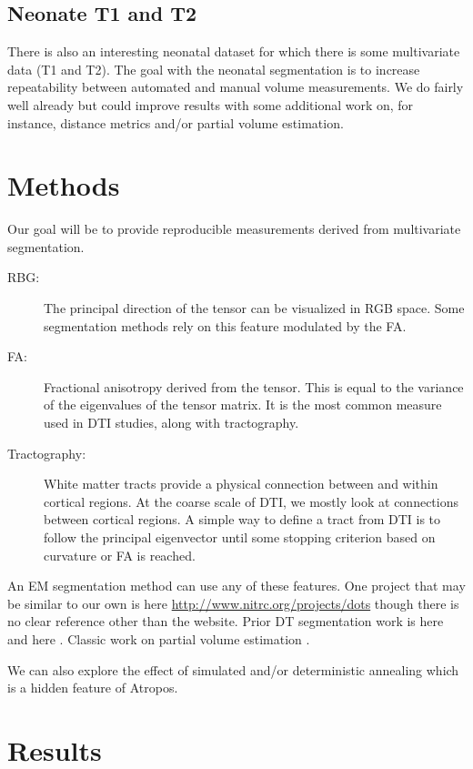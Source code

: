 \documentclass[11pt,english]{article}
\begin{document}
\subsection{Neonate T1 and T2} There is also an interesting neonatal
dataset for which there is some multivariate data (T1 and T2).  The
goal with the neonatal segmentation is to increase repeatability
between automated and manual volume measurements.  We do fairly well
already but could improve results with some additional work on, for
instance, distance metrics and/or partial volume estimation.

\section{Methods} Our goal will be to provide reproducible
measurements derived from multivariate segmentation.
\begin{description}
\item[RBG:] The principal direction of the tensor can be visualized in
  RGB space.  Some segmentation methods rely on this feature 
  modulated by the FA.
\item[FA:] Fractional anisotropy derived from the tensor.  This is
  equal to the variance of the eigenvalues of the tensor matrix.  It
  is the most common measure used in DTI studies, along with
  tractography. 
\item[Tractography:] White matter tracts provide a physical connection
  between and within cortical regions.  At the coarse scale of DTI, we mostly
  look at connections between cortical regions.  A simple way to
  define a tract from DTI is to follow the principal eigenvector until
  some stopping criterion based on curvature or FA is reached. 
\end{description}
An EM segmentation method can use any of these features.  One project
that may be similar to our own is here
\url{http://www.nitrc.org/projects/dots} though there is no clear
reference other than the website.  Prior DT segmentation work is here
\citep{Lenglet2005} and here \citep{Awate2007}.  Classic work on
partial volume estimation \citep{Santago1993,Shattuck2001}.


We can also explore the effect of simulated and/or deterministic
annealing which is a hidden feature of Atropos. 

\section{Results}
\end{document}
